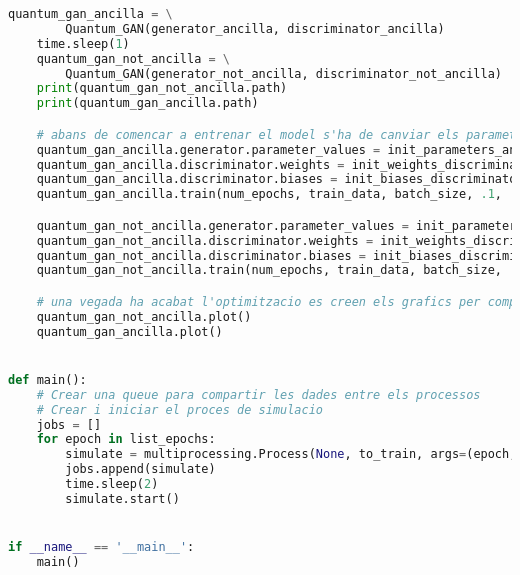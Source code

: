 \begin{lstlisting}[language=Python, caption=Executar els models amb multiprocessing]
	quantum_gan_ancilla = \
		Quantum_GAN(generator_ancilla, discriminator_ancilla)
	time.sleep(1)
	quantum_gan_not_ancilla = \
		Quantum_GAN(generator_not_ancilla, discriminator_not_ancilla)
	print(quantum_gan_not_ancilla.path)
	print(quantum_gan_ancilla.path)

	# abans de comencar a entrenar el model s'ha de canviar els parametres als definits anteriorment
	quantum_gan_ancilla.generator.parameter_values = init_parameters_ancilla
	quantum_gan_ancilla.discriminator.weights = init_weights_discriminator
	quantum_gan_ancilla.discriminator.biases = init_biases_discriminator
	quantum_gan_ancilla.train(num_epochs, train_data, batch_size, .1, .1, False)

	quantum_gan_not_ancilla.generator.parameter_values = init_parameters_not_ancilla
	quantum_gan_not_ancilla.discriminator.weights = init_weights_discriminator
	quantum_gan_not_ancilla.discriminator.biases = init_biases_discriminator
	quantum_gan_not_ancilla.train(num_epochs, train_data, batch_size, .1, .1, False)

	# una vegada ha acabat l'optimitzacio es creen els grafics per compara l'eficiencia del models
	quantum_gan_not_ancilla.plot()
	quantum_gan_ancilla.plot()


def main():
	# Crear una queue para compartir les dades entre els processos
	# Crear i iniciar el proces de simulacio
	jobs = []
	for epoch in list_epochs:
		simulate = multiprocessing.Process(None, to_train, args=(epoch,))
		jobs.append(simulate)
		time.sleep(2)
		simulate.start()


if __name__ == '__main__':
	main()
\end{lstlisting}


